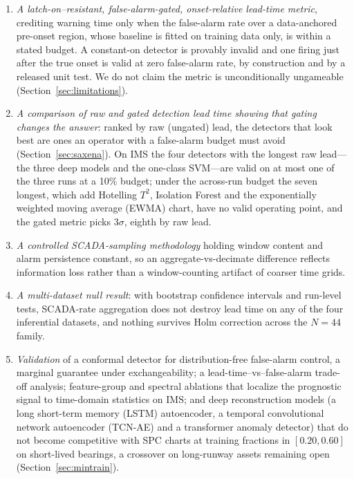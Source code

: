 \documentclass[IJPHM, 2026, 0]{PHMSociety}
\begin{document}
\begin{enumerate}
\item \emph{A latch-on--resistant, false-alarm-gated, onset-relative lead-time metric}, crediting warning time only when the false-alarm rate over a data-anchored pre-onset region, whose baseline is fitted on training data only, is within a stated budget. A constant-on detector is provably invalid and one firing just after the true onset is valid at zero false-alarm rate, by construction and by a released unit test. We do not claim the metric is unconditionally ungameable (Section~\ref{sec:limitations}).
\item \emph{A comparison of raw and gated detection lead time showing that gating changes the answer}: ranked by raw (ungated) lead, the detectors that look best are ones an operator with a false-alarm budget must avoid (Section~\ref{sec:saxena}). On IMS the four detectors with the longest raw lead---the three deep models and the one-class SVM---are valid on at most one of the three runs at a 10\% budget; under the across-run budget the seven longest, which add Hotelling $T^2$, Isolation Forest and the exponentially weighted moving average (EWMA) chart, have no valid operating point, and the gated metric picks $3\sigma$, eighth by raw lead.
\item \emph{A controlled SCADA-sampling methodology} holding window content and alarm persistence constant, so an aggregate-vs-decimate difference reflects information loss rather than a window-counting artifact of coarser time grids.
\item \emph{A multi-dataset null result}: with bootstrap confidence intervals and run-level tests, SCADA-rate aggregation does not destroy lead time on any of the four inferential datasets, and nothing survives Holm correction across the $N=44$ family.
\item \emph{Validation} of a conformal detector for distribution-free false-alarm control, a marginal guarantee under exchangeability; a lead-time--vs--false-alarm trade-off analysis; feature-group and spectral ablations that localize the prognostic signal to time-domain statistics on IMS; and deep reconstruction models (a long short-term memory (LSTM) autoencoder, a temporal convolutional network autoencoder (TCN-AE) and a transformer anomaly detector) that do not become competitive with SPC charts at training fractions in $[0.20, 0.60]$ on short-lived bearings, a crossover on long-runway assets remaining open (Section~\ref{sec:mintrain}).
\end{enumerate}
\end{document}
